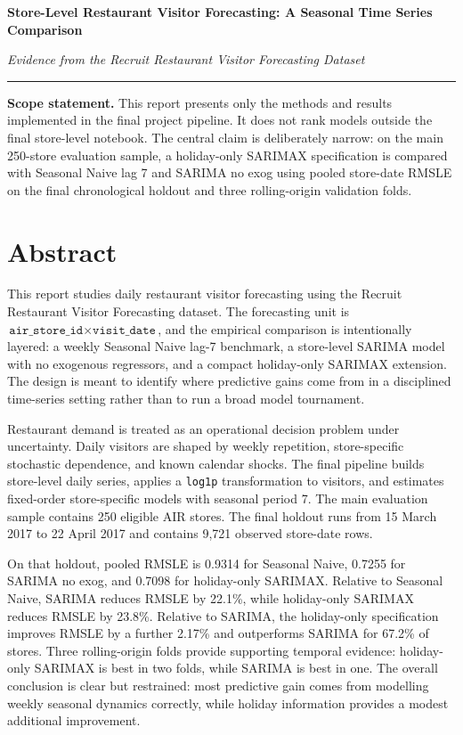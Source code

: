 \documentclass[11pt,oneside]{scrartcl}
\begin{document}
\begin{center}
{\LARGE\bfseries Store-Level Restaurant Visitor Forecasting: A Seasonal Time Series Comparison\par}
\vspace{0.5em}
{\large\itshape Evidence from the Recruit Restaurant Visitor Forecasting Dataset\par}
\vspace{1em}
\color{rulegray}\rule{\textwidth}{0.8pt}
\end{center}
\vspace{0.5em}

\tableofcontents
\newpage

\textbf{Scope statement.}
This report presents only the methods and results implemented in the final project pipeline. It does not rank models outside the final store-level notebook. The central claim is deliberately narrow: on the main 250-store evaluation sample, a holiday-only SARIMAX specification is compared with Seasonal Naive lag 7 and SARIMA no exog using pooled store-date RMSLE on the final chronological holdout and three rolling-origin validation folds.

\section*{Abstract}
This report studies daily restaurant visitor forecasting using the Recruit Restaurant Visitor Forecasting dataset. The forecasting unit is $\texttt{air\_store\_id} \times \texttt{visit\_date}$, and the empirical comparison is intentionally layered: a weekly Seasonal Naive lag-7 benchmark, a store-level SARIMA model with no exogenous regressors, and a compact holiday-only SARIMAX extension. The design is meant to identify where predictive gains come from in a disciplined time-series setting rather than to run a broad model tournament.

Restaurant demand is treated as an operational decision problem under uncertainty. Daily visitors are shaped by weekly repetition, store-specific stochastic dependence, and known calendar shocks. The final pipeline builds store-level daily series, applies a \texttt{log1p} transformation to visitors, and estimates fixed-order store-specific models with seasonal period 7. The main evaluation sample contains 250 eligible AIR stores. The final holdout runs from 15 March 2017 to 22 April 2017 and contains 9{,}721 observed store-date rows.

On that holdout, pooled RMSLE is 0.9314 for Seasonal Naive, 0.7255 for SARIMA no exog, and 0.7098 for holiday-only SARIMAX. Relative to Seasonal Naive, SARIMA reduces RMSLE by 22.1\%, while holiday-only SARIMAX reduces RMSLE by 23.8\%. Relative to SARIMA, the holiday-only specification improves RMSLE by a further 2.17\% and outperforms SARIMA for 67.2\% of stores. Three rolling-origin folds provide supporting temporal evidence: holiday-only SARIMAX is best in two folds, while SARIMA is best in one. The overall conclusion is clear but restrained: most predictive gain comes from modelling weekly seasonal dynamics correctly, while holiday information provides a modest additional improvement.
\end{document}
